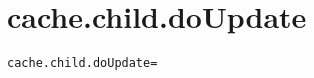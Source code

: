 \section{cache.child.doUpdate}
\label{configuration:CacheChildDoUpdate}
\ClearAPI
\TODO
\begin{lstlisting}[style=Props,caption={Usage example for \textit{cache.child.doUpdate}}]
cache.child.doUpdate=
\end{lstlisting}